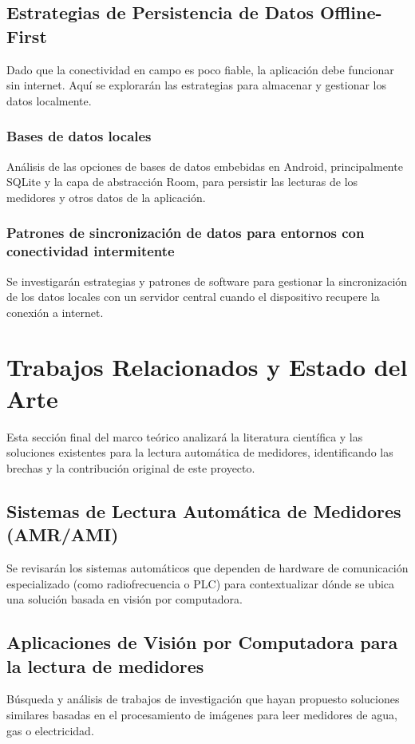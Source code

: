 \subsection{Estrategias de Persistencia de Datos Offline-First}
\label{ssec:offline_first}
Dado que la conectividad en campo es poco fiable, la aplicación debe funcionar sin internet. Aquí se explorarán las estrategias para almacenar y gestionar los datos localmente.

\subsubsection{Bases de datos locales}
\label{sssec:db_local}
Análisis de las opciones de bases de datos embebidas en Android, principalmente SQLite y la capa de abstracción Room, para persistir las lecturas de los medidores y otros datos de la aplicación.

\subsubsection{Patrones de sincronización de datos para entornos con conectividad intermitente}
\label{sssec:sincronizacion}
Se investigarán estrategias y patrones de software para gestionar la sincronización de los datos locales con un servidor central cuando el dispositivo recupere la conexión a internet.

\section{Trabajos Relacionados y Estado del Arte}
\label{sec:estado_del_arte}
Esta sección final del marco teórico analizará la literatura científica y las soluciones existentes para la lectura automática de medidores, identificando las brechas y la contribución original de este proyecto.

\subsection{Sistemas de Lectura Automática de Medidores (AMR/AMI)}
\label{ssec:amr_ami}
Se revisarán los sistemas automáticos que dependen de hardware de comunicación especializado (como radiofrecuencia o PLC) para contextualizar dónde se ubica una solución basada en visión por computadora.

\subsection{Aplicaciones de Visión por Computadora para la lectura de medidores}
\label{ssec:cv_medidores}
Búsqueda y análisis de trabajos de investigación que hayan propuesto soluciones similares basadas en el procesamiento de imágenes para leer medidores de agua, gas o electricidad.

